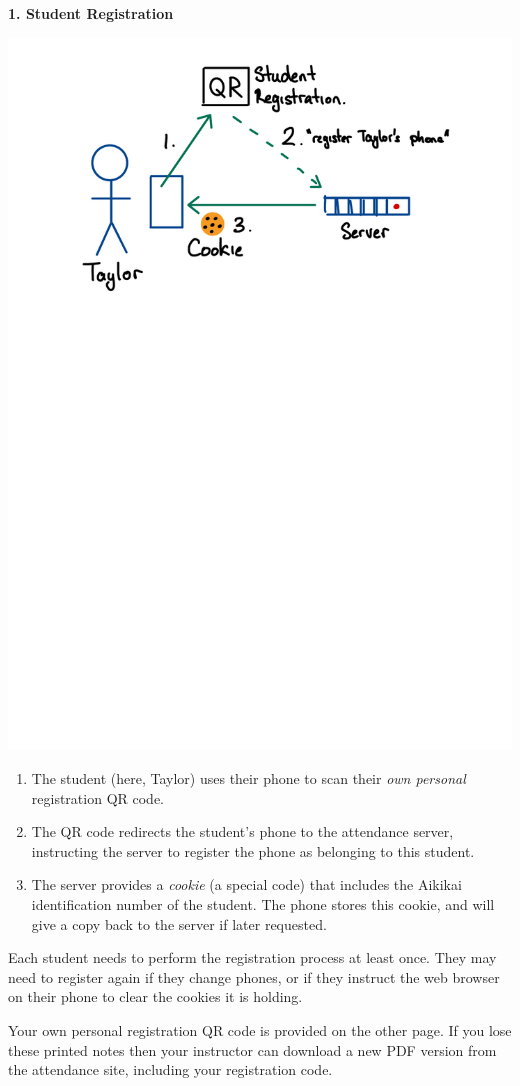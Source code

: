 \begin{minipage}[t]{\dimexpr0.5\linewidth-1em}
\textbf{1. Student Registration}
\begin{center}
\includegraphics[scale=0.4]{figure/fig-student-registration.pdf}
\end{center}

\begin{enumerate}
\item The student (here, Taylor) uses their phone to scan their
      \emph{own personal} registration QR code.

\item The QR code redirects the student's phone to the attendance server,
      instructing the server to register the phone as belonging to this student.

\item The server provides a \emph{cookie} (a special code) that includes
      the Aikikai identification number of the student. The phone stores
      this cookie, and will give a copy back to the server if later requested.
\end{enumerate}

Each student needs to perform the registration process at least once.
They may need to register again if they change phones, or if they instruct the
web browser on their phone to clear the cookies it is holding.

Your own personal registration QR code is provided on the other page.
If you lose these printed notes then your instructor can download a new PDF version
from the attendance site, including your registration code.
\end{minipage}
